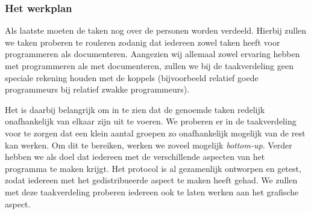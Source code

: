 \documentclass[a4paper,11pt, twoside]{article}
\begin{document}
    \subsubsection{Het werkplan}
    Als laatste moeten de taken nog over de personen worden verdeeld. Hierbij zullen we taken proberen te rouleren zodanig dat iedereen zowel taken heeft voor programmeren als documenteren. Aangezien wij allemaal zowel ervaring hebben met programmeren als met documenteren, zullen we bij de taakverdeling geen speciale rekening houden met de koppels (bijvoorbeeld relatief goede programmeurs bij relatief zwakke programmeurs). 
    
    Het is daarbij belangrijk om in te zien dat de genoemde taken redelijk onafhankelijk van elkaar zijn uit te voeren. We proberen er in de taakverdeling voor te zorgen dat een klein aantal groepen zo onafhankelijk mogelijk van de rest kan werken. Om dit te bereiken, werken we zoveel mogelijk \emph{bottom-up}. Verder hebben we als doel dat iedereen met de verschillende aspecten van het programma te maken krijgt. Het protocol is al gezamenlijk ontworpen en getest, zodat iedereen met het gedistribueerde aspect te maken heeft gehad. We zullen met deze taakverdeling proberen iedereen ook te laten werken aan het grafische aspect.
\end{document}
